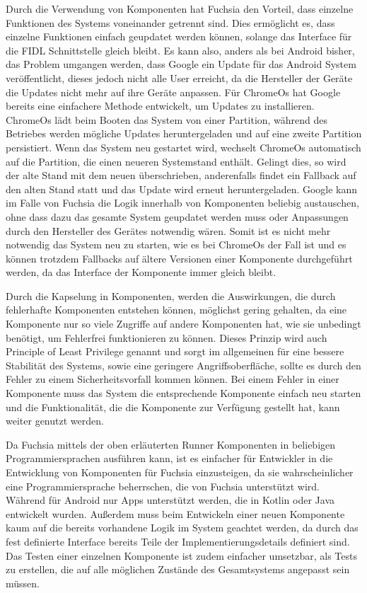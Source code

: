 \documentclass[a4paper]{scrartcl}
\begin{document}
Durch die Verwendung von Komponenten hat Fuchsia den Vorteil, dass einzelne Funktionen des Systems voneinander getrennt sind. Dies ermöglicht es, dass einzelne Funktionen einfach geupdatet werden können, solange das Interface für die FIDL Schnittstelle gleich bleibt. Es kann also, anders als bei Android bisher, das Problem umgangen werden, dass Google ein Update für das Android System veröffentlicht, dieses jedoch nicht alle User erreicht, da die Hersteller der Geräte die Updates nicht mehr auf ihre Geräte anpassen. Für ChromeOs hat Google bereits eine einfachere Methode entwickelt, um Updates zu installieren. ChromeOs lädt beim Booten das System von einer Partition, während des Betriebes werden mögliche Updates heruntergeladen und auf eine zweite Partition persistiert. Wenn das System neu gestartet wird, wechselt ChromeOs automatisch auf die Partition, die einen neueren Systemstand enthält. Gelingt dies, so wird der alte Stand mit dem neuen überschrieben, anderenfalls findet ein Fallback auf den alten Stand statt und das Update wird erneut heruntergeladen. Google kann im Falle von Fuchsia die Logik innerhalb von Komponenten beliebig austauschen, ohne dass dazu das gesamte System geupdatet werden muss oder Anpassungen durch den Hersteller des Gerätes notwendig wären. Somit ist es nicht mehr notwendig das System neu zu starten, wie es bei ChromeOs der Fall ist und es können trotzdem Fallbacks auf ältere Versionen einer Komponente durchgeführt werden, da das Interface der Komponente immer gleich bleibt. \cite{ChromeOs.Update}

Durch die Kapselung in Komponenten, werden die Auswirkungen, die durch fehlerhafte Komponenten entstehen können, möglichst gering gehalten, da eine Komponente nur so viele Zugriffe auf andere Komponenten hat, wie sie unbedingt benötigt, um Fehlerfrei funktionieren zu können. Dieses Prinzip wird auch Principle of Least Privilege genannt und sorgt im allgemeinen für eine bessere Stabilität des Systems, sowie eine geringere Angriffsoberfläche, sollte es durch den Fehler zu einem Sicherheitsvorfall kommen können.\cite{Android.Security.PoLP} Bei einem Fehler in einer Komponente muss das System die entsprechende Komponente einfach neu starten und die Funktionalität, die die Komponente zur Verfügung gestellt hat, kann weiter genutzt werden.

Da Fuchsia mittels der oben erläuterten Runner Komponenten in beliebigen Programmiersprachen ausführen kann, ist es einfacher für Entwickler in die Entwicklung von Komponenten für Fuchsia einzusteigen, da sie wahrscheinlicher eine Programmiersprache beherrschen, die von Fuchsia unterstützt wird. Während für Android nur Apps unterstützt werden, die in Kotlin oder Java entwickelt wurden. Außerdem muss beim Entwickeln einer neuen Komponente kaum auf die bereits vorhandene Logik im System geachtet werden, da durch das fest definierte Interface bereits Teile der Implementierungsdetails definiert sind. Das Testen einer einzelnen Komponente ist zudem einfacher umsetzbar, als Tests zu erstellen, die auf alle möglichen Zustände des Gesamtsystems angepasst sein müssen.
\end{document}
